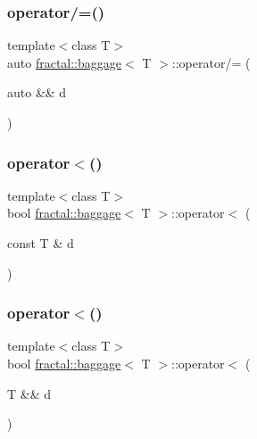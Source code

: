 \mbox{\label{classfractal_1_1baggage_aedd8c4c77dc0d2804fc5d6374524cd85}} 
\subsubsection{\texorpdfstring{operator/=()}{operator/=()}\hspace{0.1cm}{\footnotesize\ttfamily [3/3]}}
{\footnotesize\ttfamily template$<$class T$>$ \\
auto \hyperlink{classfractal_1_1baggage}{fractal\+::baggage}$<$ T $>$\+::operator/= (\begin{DoxyParamCaption}\item[{auto \&\&}]{d }\end{DoxyParamCaption})\hspace{0.3cm}{\ttfamily [inline]}}

\mbox{\label{classfractal_1_1baggage_a318fcecc8489897592370cf5c2edb588}} 
\subsubsection{\texorpdfstring{operator$<$()}{operator<()}\hspace{0.1cm}{\footnotesize\ttfamily [1/2]}}
{\footnotesize\ttfamily template$<$class T$>$ \\
bool \hyperlink{classfractal_1_1baggage}{fractal\+::baggage}$<$ T $>$\+::operator$<$ (\begin{DoxyParamCaption}\item[{const T \&}]{d }\end{DoxyParamCaption})\hspace{0.3cm}{\ttfamily [inline]}}

\mbox{\label{classfractal_1_1baggage_a249ba93cdd3c96fa0bdd13c6fe665ad7}} 
\subsubsection{\texorpdfstring{operator$<$()}{operator<()}\hspace{0.1cm}{\footnotesize\ttfamily [2/2]}}
{\footnotesize\ttfamily template$<$class T$>$ \\
bool \hyperlink{classfractal_1_1baggage}{fractal\+::baggage}$<$ T $>$\+::operator$<$ (\begin{DoxyParamCaption}\item[{T \&\&}]{d }\end{DoxyParamCaption})\hspace{0.3cm}{\ttfamily [inline]}}

